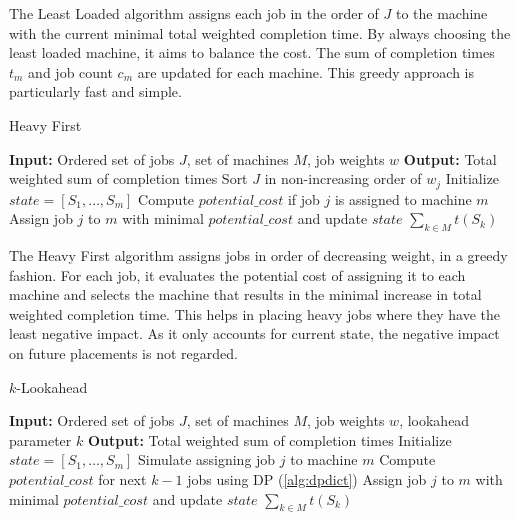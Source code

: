 The Least Loaded algorithm assigns each job in the order of $J$ to the machine with the current minimal total weighted completion time. By always choosing the least loaded machine, it aims to balance the cost. The sum of completion times $t_m$ and job count $c_m$ are updated for each machine. This greedy approach is particularly fast and simple.

\begin{algorithm}[H]
    \caption{Heavy First}\label{alg:heavyfirst}
    \begin{algorithmic}[1]
        \State \textbf{Input:} Ordered set of jobs $J$, set of machines $M$, job weights $w$
        \State \textbf{Output:} Total weighted sum of completion times
        \State Sort $J$ in non-increasing order of $w_j$
        \State Initialize $state = [S_1, \dots, S_m]$
                \State Compute $potential\_cost$ if job $j$ is assigned to machine $m$
            \EndFor
            \State Assign job $j$ to $m$ with minimal $potential\_cost$ and update $state$
        \EndFor
        \State \Return $\sum_{k \in M} t(S_k)$
    \end{algorithmic}
\end{algorithm}

The Heavy First algorithm assigns jobs in order of decreasing weight, in a greedy fashion. For each job, it evaluates the potential cost of assigning it to each machine and selects the machine that results in the minimal increase in total weighted completion time. This helps in placing heavy jobs where they have the least negative impact. As it only accounts for current state, the negative impact on future placements is not regarded.

\begin{algorithm}[H]
    \caption{$k$-Lookahead}\label{alg:klookahead}
    \begin{algorithmic}[1]
        \State \textbf{Input:} Ordered set of jobs $J$, set of machines $M$, job weights $w$, lookahead parameter $k$
        \State \textbf{Output:} Total weighted sum of completion times
        \State Initialize $state = [S_1, \dots, S_m]$
                \State Simulate assigning job $j$ to machine $m$
                \State Compute $potential\_cost$ for next $k-1$ jobs using DP (\ref{alg:dpdict})
            \EndFor
            \State Assign job $j$ to $m$ with minimal $potential\_cost$ and update $state$
        \EndFor
        \State \Return $\sum_{k \in M} t(S_k)$
    \end{algorithmic}
\end{algorithm}

